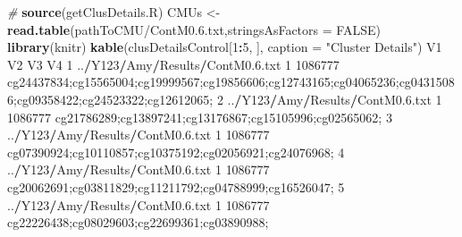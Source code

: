\documentclass[
]{article}
\newenvironment{Shaded}{\begin{snugshade}}{\end{snugshade}}
\newcommand{\AttributeTok}[1]{\textcolor[rgb]{0.13,0.29,0.53}{#1}}
\newcommand{\CommentTok}[1]{\textcolor[rgb]{0.56,0.35,0.01}{\textit{#1}}}
\newcommand{\ConstantTok}[1]{\textcolor[rgb]{0.56,0.35,0.01}{#1}}
\newcommand{\DecValTok}[1]{\textcolor[rgb]{0.00,0.00,0.81}{#1}}
\newcommand{\FloatTok}[1]{\textcolor[rgb]{0.00,0.00,0.81}{#1}}
\newcommand{\FunctionTok}[1]{\textcolor[rgb]{0.13,0.29,0.53}{\textbf{#1}}}
\newcommand{\NormalTok}[1]{#1}
\newcommand{\OtherTok}[1]{\textcolor[rgb]{0.56,0.35,0.01}{#1}}
\newcommand{\SpecialCharTok}[1]{\textcolor[rgb]{0.81,0.36,0.00}{\textbf{#1}}}
\newcommand{\StringTok}[1]{\textcolor[rgb]{0.31,0.60,0.02}{#1}}
\begin{document}
\begin{Shaded}
\begin{Highlighting}[]
\CommentTok{\# }
\FunctionTok{source}\NormalTok{(}\StringTok{\textquotesingle{}getClusDetails.R\textquotesingle{}}\NormalTok{)}
\NormalTok{CMUs }\OtherTok{\textless{}{-}} \FunctionTok{read.table}\NormalTok{(}\StringTok{\textquotesingle{}pathToCMU/ContM0.6.txt\textquotesingle{}}\NormalTok{,}\AttributeTok{stringsAsFactors =} \ConstantTok{FALSE}\NormalTok{)}
\FunctionTok{library}\NormalTok{(knitr)}
\FunctionTok{kable}\NormalTok{(clusDetailsControl[}\DecValTok{1}\SpecialCharTok{:}\DecValTok{5}\NormalTok{, ], }\AttributeTok{caption =} \StringTok{"Cluster Details"}\NormalTok{)                               V1 V2      V3                                                                                                             V4}
\DecValTok{1}\NormalTok{ ..}\SpecialCharTok{/}\NormalTok{Y123}\SpecialCharTok{/}\NormalTok{Amy}\SpecialCharTok{/}\NormalTok{Results}\SpecialCharTok{/}\NormalTok{ContM0.}\FloatTok{6.}\NormalTok{txt  }\DecValTok{1} \DecValTok{1086777}\NormalTok{ cg24437834;cg15565004;cg19999567;cg19856606;cg12743165;cg04065236;cg04315086;cg09358422;cg24523322;cg12612065;}
\DecValTok{2}\NormalTok{ ..}\SpecialCharTok{/}\NormalTok{Y123}\SpecialCharTok{/}\NormalTok{Amy}\SpecialCharTok{/}\NormalTok{Results}\SpecialCharTok{/}\NormalTok{ContM0.}\FloatTok{6.}\NormalTok{txt  }\DecValTok{1} \DecValTok{1086777}\NormalTok{                                                        cg21786289;cg13897241;cg13176867;cg15105996;cg02565062;}
\DecValTok{3}\NormalTok{ ..}\SpecialCharTok{/}\NormalTok{Y123}\SpecialCharTok{/}\NormalTok{Amy}\SpecialCharTok{/}\NormalTok{Results}\SpecialCharTok{/}\NormalTok{ContM0.}\FloatTok{6.}\NormalTok{txt  }\DecValTok{1} \DecValTok{1086777}\NormalTok{                                                        cg07390924;cg10110857;cg10375192;cg02056921;cg24076968;}
\DecValTok{4}\NormalTok{ ..}\SpecialCharTok{/}\NormalTok{Y123}\SpecialCharTok{/}\NormalTok{Amy}\SpecialCharTok{/}\NormalTok{Results}\SpecialCharTok{/}\NormalTok{ContM0.}\FloatTok{6.}\NormalTok{txt  }\DecValTok{1} \DecValTok{1086777}\NormalTok{                                                        cg20062691;cg03811829;cg11211792;cg04788999;cg16526047;}
\DecValTok{5}\NormalTok{ ..}\SpecialCharTok{/}\NormalTok{Y123}\SpecialCharTok{/}\NormalTok{Amy}\SpecialCharTok{/}\NormalTok{Results}\SpecialCharTok{/}\NormalTok{ContM0.}\FloatTok{6.}\NormalTok{txt  }\DecValTok{1} \DecValTok{1086777}\NormalTok{                                                                   cg22226438;cg08029603;cg22699361;cg03890988;}
\end{Highlighting}
\end{Shaded}
\end{document}
